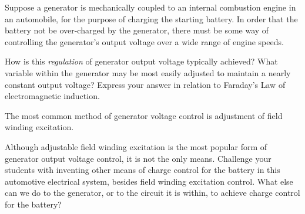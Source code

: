 

Suppose a generator is mechanically coupled to an internal combustion engine in an automobile, for the purpose of charging the starting battery.  In order that the battery not be over-charged by the generator, there must be some way of controlling the generator's output voltage over a wide range of engine speeds.

How is this {\it regulation} of generator output voltage typically achieved?  What variable within the generator may be most easily adjusted to maintain a nearly constant output voltage?  Express your answer in relation to Faraday's Law of electromagnetic induction.







The most common method of generator voltage control is adjustment of field winding excitation.







Although adjustable field winding excitation is the most popular form of generator output voltage control, it is not the only means.  Challenge your students with inventing other means of charge control for the battery in this automotive electrical system, besides field winding excitation control.  What else can we do to the generator, or to the circuit it is within, to achieve charge control for the battery?




